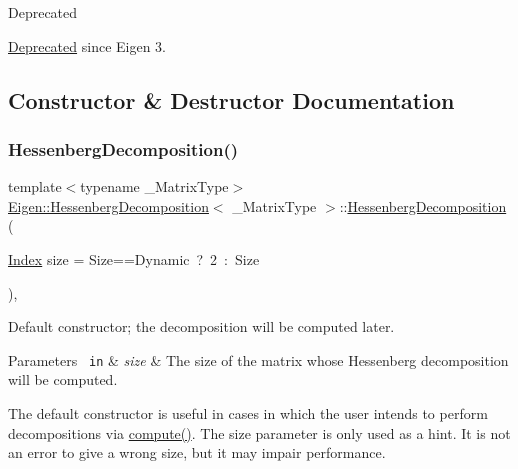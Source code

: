\begin{DoxyRefDesc}{Deprecated}
\item[\mbox{\hyperlink{deprecated__deprecated000020}{Deprecated}}]since Eigen 3. \end{DoxyRefDesc}


\subsection{Constructor \& Destructor Documentation}
\mbox{\label{class_eigen_1_1_hessenberg_decomposition_aee1724cb6418ede1a8b9045036a5a319}} 
\subsubsection{\texorpdfstring{HessenbergDecomposition()}{HessenbergDecomposition()}\hspace{0.1cm}{\footnotesize\ttfamily [1/2]}}
{\footnotesize\ttfamily template$<$typename \+\_\+\+Matrix\+Type$>$ \\
\mbox{\hyperlink{class_eigen_1_1_hessenberg_decomposition}{Eigen\+::\+Hessenberg\+Decomposition}}$<$ \+\_\+\+Matrix\+Type $>$\+::\mbox{\hyperlink{class_eigen_1_1_hessenberg_decomposition}{Hessenberg\+Decomposition}} (\begin{DoxyParamCaption}\item[{\mbox{\hyperlink{class_eigen_1_1_hessenberg_decomposition_a8e287ac222f53e2c8ce82faa43e95ac6}{Index}}}]{size = {\ttfamily Size==Dynamic~?~2~\+:~Size} }\end{DoxyParamCaption})\hspace{0.3cm}{\ttfamily [inline]}, {\ttfamily [explicit]}}



Default constructor; the decomposition will be computed later. 


\begin{DoxyParams}[1]{Parameters}
\mbox{\texttt{ in}}  & {\em size} & The size of the matrix whose Hessenberg decomposition will be computed.\\
\hline
\end{DoxyParams}
The default constructor is useful in cases in which the user intends to perform decompositions via \mbox{\hyperlink{class_eigen_1_1_hessenberg_decomposition_a239a6fd42c57aab3c0b048c47fde3004}{compute()}}. The {\ttfamily size} parameter is only used as a hint. It is not an error to give a wrong {\ttfamily size}, but it may impair performance.

